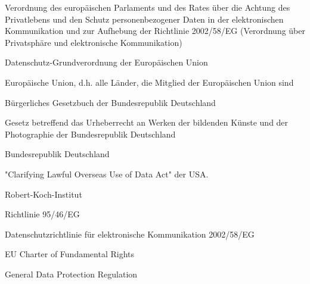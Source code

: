 {
    Verordnung des europäischen Parlaments und des Rates über die Achtung des
Privatlebens und den Schutz personenbezogener Daten in der elektronischen
Kommunikation und zur Aufhebung der Richtlinie 2002/58/EG (Verordnung über
Privatsphäre und elektronische Kommunikation)
}

{
    Datenschutz-Grundverordnung der Europäischen Union
}

{  
    Europäische Union, d.h. alle Länder, die Mitglied der Europäischen Union sind
}

{
    Bürgerliches Gesetzbuch der Bundesrepublik Deutschland
}

{
    Gesetz betreffend das Urheberrecht an Werken der bildenden Künste und der Photographie der Bundesrepublik Deutschland
}

{
    Bundesrepublik Deutschland
}

{
    "Clarifying Lawful Overseas Use of Data Act" der USA.
}

{
    Robert-Koch-Institut
}

{
    Richtlinie 95/46/EG
}

{
Datenschutzrichtlinie für elektronische Kommunikation 2002/58/EG
}

{
EU Charter of Fundamental Rights
}

{
General Data Protection Regulation
}
